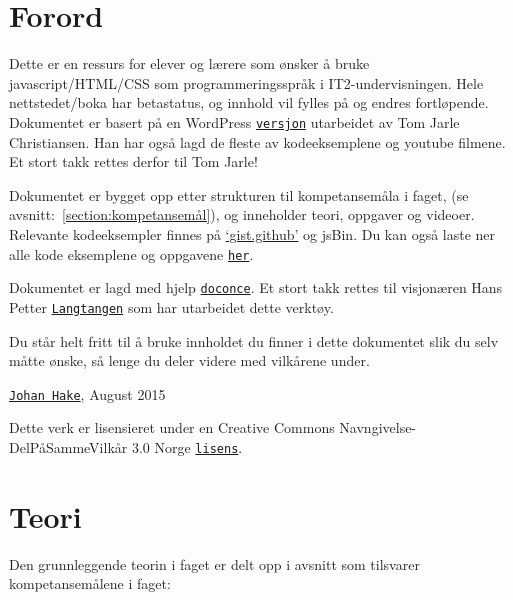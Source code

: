 \documentclass[%
oneside,                 %
final,                   %
10pt]{article}
\begin{document}
\pagebreak

\section{Forord}
\label{section:forord}

Dette er en ressurs for elever og lærere som ønsker å bruke
javascript/HTML/CSS som programmeringsspråk i IT2-undervisningen. Hele
nettstedet/boka har betastatus, og innhold vil fylles på og endres
fortløpende. Dokumentet er basert på en WordPress
\href{{http://www.fuzzbin.org/IT2}}{\nolinkurl{versjon}} utarbeidet av Tom Jarle
Christiansen. Han har også lagd de fleste av kodeeksemplene og youtube
filmene. Et stort takk rettes derfor til Tom Jarle!

Dokumentet er bygget opp etter strukturen til kompetansemåla i faget,
(se avsnitt:~\ref{section:kompetansemål}), og inneholder teori,
oppgaver og videoer. Relevante kodeeksempler finnes på
\href{{http://gist.github.com/johanhake}}{`gist.github'} og jsBin. Du kan
også laste ner alle kode eksemplene og oppgavene
\href{{https://github.com/johanhake/it2/blob/master/kode.zip?raw=true}}{\nolinkurl{her}}.

Dokumentet er lagd med hjelp
\href{{http://hplgit.github.io/doconce/doc/web/index.html}}{\nolinkurl{doconce}}.  Et
stort takk rettes til visjonæren Hans Petter
\href{{http://hplgit.github.io/homepage/index.html}}{\nolinkurl{Langtangen}} som har
utarbeidet dette verktøy.


Du står helt fritt til å bruke innholdet du finner i dette dokumentet
slik du selv måtte ønske, så lenge du deler videre med vilkårene
under. 

\href{{mailto:johan.hake@gmail.com}}{\nolinkurl{Johan Hake}}, August 2015

Dette verk er lisensieret under en Creative Commons
Navngivelse-DelPåSammeVilkår 3.0 Norge
\href{{http://creativecommons.org/licenses/by-sa/3.0/no/}}{\nolinkurl{lisens}}.


\pagebreak

\section{Teori}

Den grunnleggende teorin i faget er delt opp i avsnitt som tilsvarer
kompetansemålene i faget:
\end{document}
